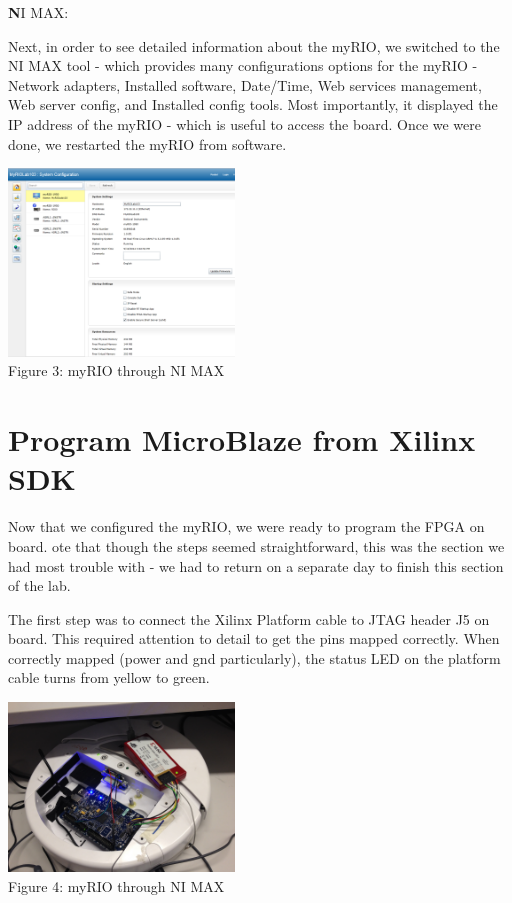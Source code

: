 \documentclass[twoside]{article}
\begin{document}
\begin{multicols}{2}
\textbf NI MAX:

Next, in order to see detailed information about the myRIO, we switched to the NI MAX tool - which provides many configurations options for the myRIO - Network adapters, Installed software, Date/Time, Web services management, Web server config, and Installed config tools. Most importantly, it displayed the IP address of the myRIO - which is useful to access the board. Once we were done, we restarted the myRIO from software.

\begin{center}
\includegraphics*[width = 6cm]{Fig3.png}\\
Figure 3: myRIO through NI MAX
\end{center}
 

\section{Program MicroBlaze from Xilinx SDK}

Now that we configured the myRIO, we were ready to program the FPGA on board. ote that though the steps seemed straightforward, this was the section we had most trouble with - we had to return on a separate day to finish this section of the lab.

\noindent The first step was to connect the Xilinx Platform cable to JTAG header J5 on board. This required attention to detail to get the pins mapped correctly. When correctly mapped (power and gnd particularly), the status LED on the platform cable turns from yellow to green. 

\begin{center}
\includegraphics*[width = 6cm]{Fig4.jpg}\\
Figure 4: myRIO through NI MAX
\end{center}


\end{multicols}
\end{document}
